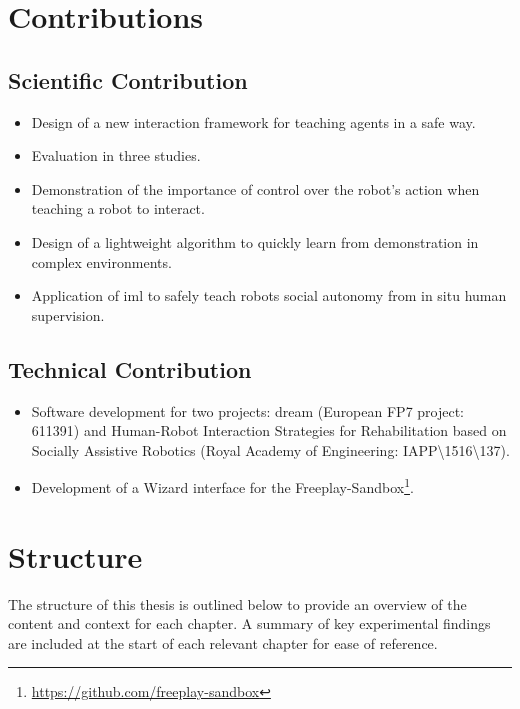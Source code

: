 \section{Contributions}\label{sec:intro-contr}

\subsection{Scientific Contribution}
\begin{itemize}
	\item Design of a new interaction framework for teaching agents in a safe way.
	\item Evaluation in three studies.
	\item Demonstration of the importance of control over the robot's action when teaching a robot to interact.
	\item Design of a lightweight algorithm to quickly learn from demonstration in complex environments.
	\item Application of \gls{iml} to safely teach robots social autonomy from in situ human supervision. 
\end{itemize}

\subsection{Technical Contribution}
\begin{itemize}
	\item Software development for two projects: \acrshort{dream} (European FP7 project: 611391) and Human-Robot Interaction Strategies for Rehabilitation based on Socially Assistive Robotics (Royal Academy of Engineering: IAPP\textbackslash1516\textbackslash137).
	\item Development of a Wizard interface for the Freeplay-Sandbox\footnote{\url{https://github.com/freeplay-sandbox}}. 
\end{itemize}
	
\section{Structure}\label{sec:intro-struct}
The structure of this thesis is outlined below to provide an overview of the content and context for each chapter. A summary of key experimental findings are included at the start of each relevant chapter for ease of reference. 

